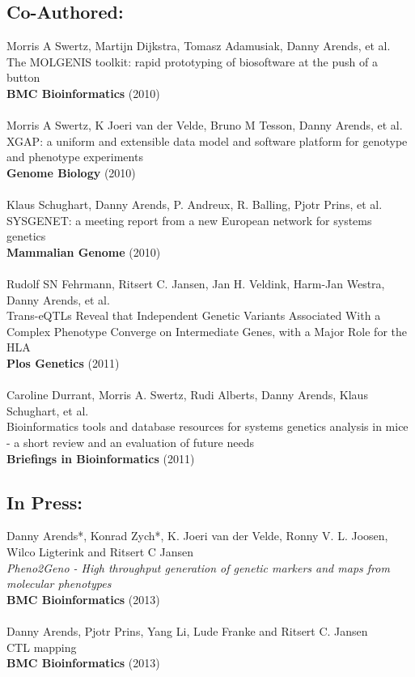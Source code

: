 \documentclass[8pt, twoside, a5paper]{report}
\newcommand{\authors}[1]{\small{#1}}
\newcommand{\bold}[1]{{\bfseries #1}}
\begin{document}
\subsection*{Co-Authored:}
  \authors{Morris A Swertz, Martijn Dijkstra, Tomasz Adamusiak, Danny Arends, et al.}\\
  The MOLGENIS toolkit: rapid prototyping of biosoftware at the push of a button\\
  \bold{BMC Bioinformatics} (2010)\\\\
  \authors{Morris A Swertz, K Joeri van der Velde, Bruno M Tesson, Danny Arends, et al.}\\
  XGAP: a uniform and extensible data model and software platform for genotype and phenotype experiments\\
  \bold{Genome Biology} (2010)\\\\
  \authors{Klaus Schughart, Danny Arends, P. Andreux, R. Balling, Pjotr Prins, et al.}\\
  SYSGENET: a meeting report from a new European network for systems genetics\\
  \bold{Mammalian Genome} (2010)\\\\
  \authors{Rudolf SN Fehrmann, Ritsert C. Jansen, Jan H. Veldink, Harm-Jan Westra, Danny Arends, et al.}\\
  Trans-eQTLs Reveal that Independent Genetic Variants Associated With a Complex Phenotype Converge on Intermediate Genes, with a Major Role for the HLA\\
  \bold{Plos Genetics} (2011)\\\\
  \authors{Caroline Durrant, Morris A. Swertz, Rudi Alberts, Danny Arends, Klaus Schughart, et al.}\\
  Bioinformatics tools and database resources for systems genetics analysis in mice - a short review and an evaluation of future needs\\
  \bold{Briefings in Bioinformatics} (2011)

\subsection*{In Press:}
  \authors{Danny Arends*, Konrad Zych*, K. Joeri van der Velde, Ronny V. L. Joosen, Wilco Ligterink and Ritsert C Jansen}\\
  \emph{Pheno2Geno - High throughput generation of genetic markers and maps from molecular phenotypes}\\
  \bold{BMC Bioinformatics} (2013)\\\\
  \authors{Danny Arends, Pjotr Prins, Yang Li, Lude Franke and Ritsert C. Jansen}\\
  CTL mapping\\
  \bold{BMC Bioinformatics} (2013)
\end{document}
